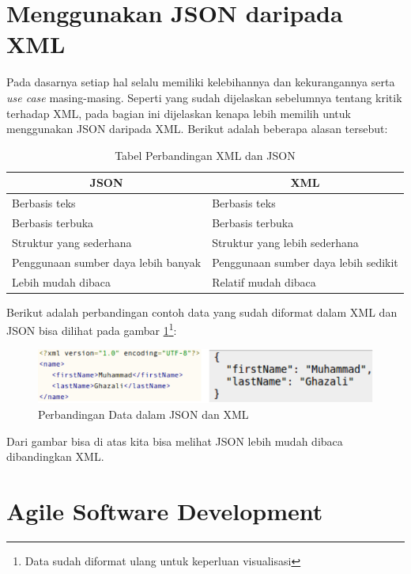 \documentclass[a4paper, 12pt, oneside]{report}
\begin{document}
\newpage
\section{Menggunakan JSON daripada XML}

\onehalfspacing Pada dasarnya setiap hal selalu memiliki kelebihannya dan kekurangannya serta \textit{use case} masing-masing. Seperti yang sudah dijelaskan sebelumnya tentang kritik terhadap XML, pada bagian ini dijelaskan kenapa lebih memilih untuk menggunakan JSON daripada XML. Berikut adalah beberapa alasan tersebut:

\begin{table}[h]
\caption {Tabel Perbandingan XML dan JSON} \label{tabel-perbandingan-xml-json}
\begin{tabular}{|l|l|}
 \hline
\multicolumn{1}{|c|}{JSON} & \multicolumn{1}{|c|}{XML} \\ \hline
Berbasis teks & Berbasis teks \\ \hline
Berbasis terbuka & Berbasis terbuka \\ \hline
Struktur yang sederhana & Struktur yang lebih sederhana \\ \hline
Penggunaan sumber daya lebih banyak & Penggunaan sumber daya lebih sedikit  \\ \hline
Lebih mudah dibaca & Relatif mudah dibaca \\ \hline
\end{tabular}
\end{table}

Berikut adalah perbandingan contoh data yang sudah diformat dalam XML dan JSON bisa dilihat pada gambar \ref{figure:xml-json-source}\footnote{Data sudah diformat ulang untuk keperluan visualisasi}:

\begin{figure}[htp]
\centering
\includegraphics[scale=0.65]{images/perbandingan-xml-json.png}
\caption{Perbandingan Data dalam JSON dan XML}
\label{figure:xml-json-source}
\end{figure}

Dari gambar bisa di atas kita bisa melihat JSON lebih mudah dibaca dibandingkan XML.

\section{Agile Software Development}
\end{document}
